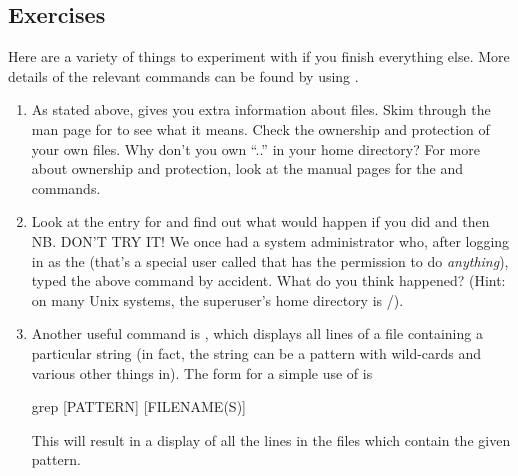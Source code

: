 \subsection{Exercises}

Here are a variety of things to experiment with if you finish
everything else. More details of the relevant commands can be found
by using .
%
\begin{enumerate}
%
%
\item As stated above,  gives you extra information
 about files. Skim through the man page for  to see what
 it means. Check the ownership and protection of your
 own files. Why don't you own ``..''  in your home directory? For more
 about ownership and protection, look at the manual pages for the
  and  commands.
%
\item Look at the  entry for   and find out
  what would happen if you did  and then  
  \\ 
  NB. DON'T TRY IT!  We once had a system administrator who, after
  logging in as the  (that's a special user called
   that has the permission to do \emph{anything}), typed
  the above command by accident. What do you think happened? (Hint: on
  many Unix systems, the superuser's home directory is /).
\item Another useful command is , which displays all
  lines of a file containing a particular string (in fact, the
  string can be a pattern with wild-cards and various other things in).
  The form for a simple use of  is
\begin{ttoutenv}
  grep [PATTERN] [FILENAME(S)]
\end{ttoutenv}
%
This will result in a display of all the lines in the files which
contain the given pattern.


\end{enumerate}
